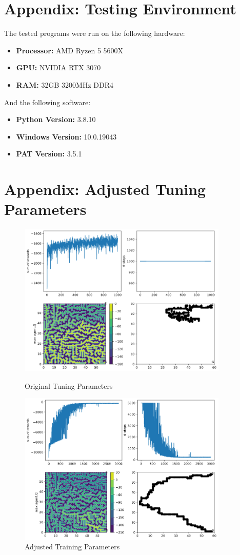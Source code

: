 \documentclass[twoside, 12pt, a4paper]{article}
\begin{document}
\section {Appendix: Testing Environment} \label{appendix:environment}
The tested programs were run on the following hardware: 
\begin{itemize}
\item \textbf{Processor:} AMD Ryzen 5 5600X 
\item \textbf{GPU:} NVIDIA RTX 3070 
\item \textbf{RAM:} 32GB 3200MHz DDR4
\end{itemize}
And the following software:
\begin{itemize}
\item \textbf{Python Version:} 3.8.10
\item \textbf{Windows Version:} 10.0.19043
\item \textbf{PAT Version:} 3.5.1
\end{itemize}

\section {Appendix: Adjusted Tuning Parameters} \label{appendix:Tuning}

\begin{figure}[ht]
\begin{center}
\includegraphics[width=10cm]{UntunedTraining.png}
\caption{\label{tab:table-name}Original Tuning Parameters}

\includegraphics[width=10cm]{TunedTraining.png} 
\caption{\label{tab:table-name}Adjusted Training Parameters}

\end {center}
\end{figure}
\end{document}
